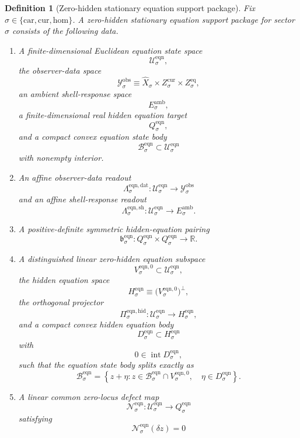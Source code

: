 \documentclass[11pt]{article}
\newcommand{\Car}{\mathrm{car}}
\newcommand{\Cur}{\mathrm{cur}}
\newcommand{\Hom}{\mathrm{hom}}
\newcommand{\VisibleAffine}[1]{\widehat X_{#1}}
\newcommand{\DataSpace}[1]{\mathcal Y_{#1}^{\mathrm{obs}}}
\newcommand{\AmbientTarget}[1]{E_{#1}^{\mathrm{amb}}}
\newcommand{\EqnSpace}[1]{\mathcal U_{#1}^{\mathrm{eqn}}}
\newcommand{\EqnBody}[1]{\mathcal B_{#1}^{\mathrm{eqn}}}
\newcommand{\EqnData}[1]{\Lambda_{#1}^{\mathrm{eqn,dat}}}
\newcommand{\EqnShell}[1]{\Lambda_{#1}^{\mathrm{eqn,sh}}}
\newcommand{\EqnTarget}[1]{Q_{#1}^{\mathrm{eqn}}}
\newcommand{\EqnPair}[1]{\mathfrak b_{#1}^{\mathrm{eqn}}}
\newcommand{\EqnZero}[1]{V_{#1}^{\mathrm{eqn},0}}
\newcommand{\EqnHidden}[1]{H_{#1}^{\mathrm{eqn}}}
\newcommand{\EqnHiddenBody}[1]{D_{#1}^{\mathrm{eqn}}}
\newcommand{\EqnProj}[1]{\Pi_{#1}^{\mathrm{eqn,hid}}}
\newcommand{\EqnLin}[1]{\mathcal N_{#1}^{\mathrm{eqn}}}
\newtheorem{definition}{Definition}
\begin{document}
\begin{definition}[Zero-hidden stationary equation support package]
\label{def:support}
Fix \(\sigma\in\{\Car,\Cur,\Hom\}\). A \emph{zero-hidden stationary equation support package} for sector \(\sigma\) consists of the following data.
\begin{enumerate}
    \item A finite-dimensional Euclidean equation state space
    \[
    \EqnSpace{\sigma},
    \]
    the observer-data space
    \[
    \DataSpace{\sigma}
    \equiv
    \VisibleAffine{\sigma}\times Z_{\sigma}^{\mathrm{cur}}\times Z_{\sigma}^{\mathrm{eq}},
    \]
    an ambient shell-response space
    \[
    \AmbientTarget{\sigma},
    \]
    a finite-dimensional real hidden equation target
    \[
    \EqnTarget{\sigma},
    \]
    and a compact convex equation state body
    \[
    \EqnBody{\sigma}\subset\EqnSpace{\sigma}
    \]
    with nonempty interior.
    \item An affine observer-data readout
    \[
    \EqnData{\sigma}:\EqnSpace{\sigma}\to\DataSpace{\sigma}
    \]
    and an affine shell-response readout
    \[
    \EqnShell{\sigma}:\EqnSpace{\sigma}\to\AmbientTarget{\sigma}.
    \]
    \item A positive-definite symmetric hidden-equation pairing
    \[
    \EqnPair{\sigma}:
    \EqnTarget{\sigma}\times\EqnTarget{\sigma}\to\mathbb R.
    \]
    \item A distinguished linear zero-hidden equation subspace
    \[
    \EqnZero{\sigma}\subset\EqnSpace{\sigma},
    \]
    the hidden equation space
    \[
    \EqnHidden{\sigma}
    \equiv
    \bigl(\EqnZero{\sigma}\bigr)^{\perp},
    \]
    the orthogonal projector
    \[
    \EqnProj{\sigma}:\EqnSpace{\sigma}\to\EqnHidden{\sigma},
    \]
    and a compact convex hidden equation body
    \[
    \EqnHiddenBody{\sigma}\subset\EqnHidden{\sigma}
    \]
    with
    \[
    0\in\operatorname{int}\EqnHiddenBody{\sigma},
    \]
    such that the equation state body splits exactly as
    \begin{equation}
    \EqnBody{\sigma}
    =
    \left\{
    z+\eta:
    z\in\EqnBody{\sigma}\cap\EqnZero{\sigma},
    \quad
    \eta\in\EqnHiddenBody{\sigma}
    \right\}.
    \label{eq:supportsplitting}
    \end{equation}
    \item A linear common zero-locus defect map
    \[
    \EqnLin{\sigma}:\EqnSpace{\sigma}\to\EqnTarget{\sigma}
    \]
    satisfying
    \begin{equation}
    \EqnLin{\sigma}(\delta z)=0

\end{equation}
\end{enumerate}
\end{definition}
\end{document}
